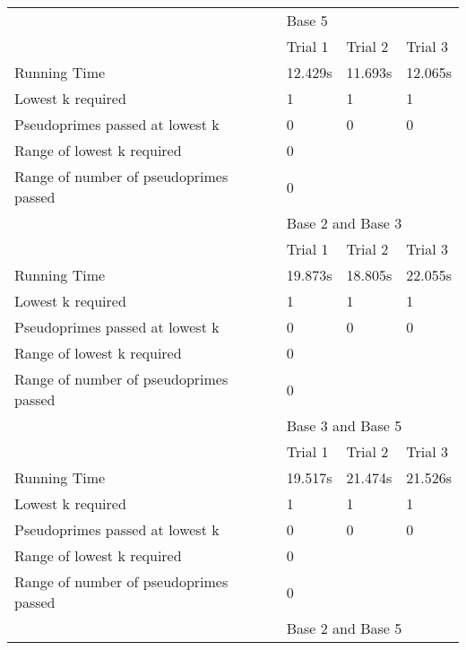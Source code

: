 \documentclass{article}
\begin{document}
\begin{table}[h]
\begin{tabular}{@{}llll@{}}
                                       & \multicolumn{3}{l}{Base 5}            \\
                                       & Trial 1     & Trial 2    & Trial 3    \\
Running Time                           & 12.429s     & 11.693s    & 12.065s    \\
Lowest k required                      & 1           & 1          & 1          \\
Pseudoprimes passed at lowest k        & 0           & 0          & 0          \\
Range of lowest k required             & \multicolumn{3}{l}{0}                 \\
Range of number of pseudoprimes passed & \multicolumn{3}{l}{0}                 \\
                                       & \multicolumn{3}{l}{Base 2 and Base 3} \\
                                       & Trial 1     & Trial 2    & Trial 3    \\
Running Time                           & 19.873s     & 18.805s    & 22.055s    \\
Lowest k required                      & 1           & 1          & 1          \\
Pseudoprimes passed at lowest k        & 0           & 0          & 0          \\
Range of lowest k required             & \multicolumn{3}{l}{0}                 \\
Range of number of pseudoprimes passed & \multicolumn{3}{l}{0}                 \\
                                       & \multicolumn{3}{l}{Base 3 and Base 5} \\
                                       & Trial 1     & Trial 2    & Trial 3    \\
Running Time                           & 19.517s     & 21.474s    & 21.526s    \\
Lowest k required                      & 1           & 1          & 1          \\
Pseudoprimes passed at lowest k        & 0           & 0          & 0          \\
Range of lowest k required             & \multicolumn{3}{l}{0}                 \\
Range of number of pseudoprimes passed & \multicolumn{3}{l}{0}                 \\
                                       & \multicolumn{3}{l}{Base 2 and Base 5} \\

\end{tabular}
\end{table}
\end{document}
